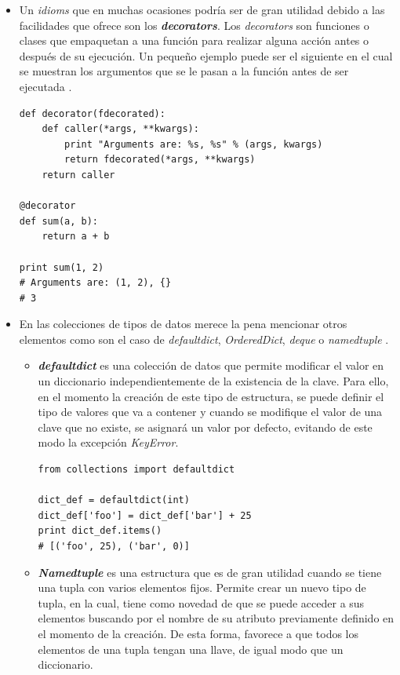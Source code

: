 \documentclass[a4paper, 12pt]{book}
\begin{document}
\begin{itemize}
\item Un \textit{idioms} que en muchas ocasiones podría ser de gran utilidad debido a las facilidades que ofrece son los \textbf{\textit{decorators}}. Los \textit{decorators} son funciones o clases que empaquetan a una función para realizar alguna acción antes o después de su ejecución. Un pequeño ejemplo puede ser el siguiente en el cual se muestran los argumentos que se le pasan a la función antes de ser ejecutada \cite{Browning:2014:PP:2723813}.

\begin{verbatim}
def decorator(fdecorated):
    def caller(*args, **kwargs):
        print "Arguments are: %s, %s" % (args, kwargs)
        return fdecorated(*args, **kwargs)
    return caller

@decorator
def sum(a, b):
    return a + b

print sum(1, 2)
# Arguments are: (1, 2), {}
# 3
\end{verbatim}



\item En las colecciones de tipos de datos merece la pena mencionar otros elementos como son el caso de \textit{defaultdict}, \textit{OrderedDict}, \textit{deque} o \textit{namedtuple} \cite{ramalho2015fluent}.

\begin{itemize}
\item \textbf{\textit{defaultdict}} es una colección de datos que permite modificar el valor en un diccionario independientemente de la existencia de la clave. Para ello, en el momento la creación de este tipo de estructura, se puede definir el tipo de valores que va a contener y cuando se modifique el valor de una clave que no existe, se asignará un valor por defecto, evitando de este modo la excepción \textit{KeyError}.

\begin{verbatim}
from collections import defaultdict

dict_def = defaultdict(int)
dict_def['foo'] = dict_def['bar'] + 25
print dict_def.items()
# [('foo', 25), ('bar', 0)]
\end{verbatim}


\item \textbf{\textit{Namedtuple}} es una estructura que es de gran utilidad cuando se tiene una tupla con varios elementos fijos. Permite crear un nuevo tipo de tupla, en la cual, tiene como novedad de que se puede acceder a sus elementos buscando por el nombre de su atributo previamente definido en el momento de la creación. De esta forma, favorece a que todos los elementos de una tupla tengan una llave, de igual modo que un diccionario.


\end{itemize}
\end{itemize}
\end{document}
